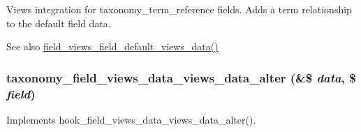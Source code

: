 Views integration for taxonomy\_\-term\_\-reference fields. Adds a term relationship to the default field data.

\begin{DoxySeeAlso}{See also}
\hyperlink{field_8views_8inc_adbb71dc4cb1642151e243f305ba34223}{field\_\-views\_\-field\_\-default\_\-views\_\-data()} 
\end{DoxySeeAlso}
\hypertarget{taxonomy_8views_8inc_a3bc51da9827bc04f4afe696788e313bd}{
\subsubsection[{taxonomy\_\-field\_\-views\_\-data\_\-views\_\-data\_\-alter}]{\setlength{\rightskip}{0pt plus 5cm}taxonomy\_\-field\_\-views\_\-data\_\-views\_\-data\_\-alter (\&\$ {\em data}, \/  \$ {\em field})}}
\label{taxonomy_8views_8inc_a3bc51da9827bc04f4afe696788e313bd}
Implements hook\_\-field\_\-views\_\-data\_\-views\_\-data\_\-alter().

